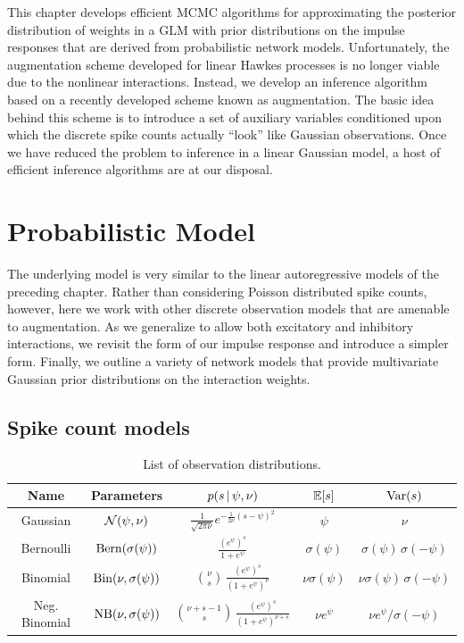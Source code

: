 This chapter develops efficient MCMC algorithms for approximating the 
posterior distribution of weights in a GLM with prior distributions on the 
impulse responses that are derived from probabilistic network models.
Unfortunately, the augmentation scheme developed for linear Hawkes 
processes is no longer viable due to the nonlinear interactions. Instead,
we develop an inference algorithm based on a recently developed scheme 
known as \polyagamma augmentation. The basic idea behind this scheme is 
to introduce a set of auxiliary variables conditioned upon which the 
discrete spike counts actually ``look'' like Gaussian observations.
Once we have reduced the problem to inference in a linear Gaussian model,
a host of efficient inference algorithms are at our disposal. 


\section{Probabilistic Model}
The underlying model is very similar to the linear autoregressive 
models of the preceding chapter. Rather than considering Poisson 
distributed spike counts, however, here we work with other discrete 
observation models that are amenable to \polyagamma augmentation. 
As we generalize to allow both excitatory and inhibitory interactions, 
we revisit the form of our impulse response and introduce a simpler
form. Finally, we outline a variety of network models that provide 
multivariate Gaussian prior distributions on the interaction weights.

\subsection{Spike count models}

\begin{table}
\begin{center}
\begin{tabular}{c|c|c|c|c}
  \textbf{Name} & Parameters & $p(s \,|\, \psi, \nu)$ & $\mathbb{E}[s]$ & $\mathrm{Var}(s)$ \\
  \hline
  Gaussian 
  & $\mathcal{N}(\psi, \nu)$ 
  & $\frac{1}{\sqrt{2 \pi \nu}} e^{ -\frac{1}{2 \nu} (s - \psi)^2}$
  & $\psi$ & $\nu$ \\
  Bernoulli 
  & $\mathrm{Bern}(\sigma(\psi))$ 
  & $\frac{(e^\psi)^s}{1+e^\psi}$
  & $\sigma(\psi)$ & $\sigma(\psi) \, \sigma(-\psi)$ \\
  Binomial 
  & $\mathrm{Bin}(\nu, \sigma(\psi))$ 
  & ${\nu \choose s} \,\frac{(e^\psi)^s}{(1+e^\psi)^\nu}$
  & $\nu \sigma(\psi)$ & $\nu \sigma(\psi) \, \sigma(-\psi)$ \\
  Neg. Binomial 
  & $\mathrm{NB}(\nu, \sigma(\psi))$
  & ${\nu +s - 1 \choose s} \,\frac{(e^\psi)^s}{(1+e^\psi)^{\nu+s}}$
  & $\nu e^\psi$ & $\nu e^\psi / \sigma(-\psi)$ \\
\end{tabular}
\end{center}
\caption{List of observation distributions.}
\label{tab:obs_models}
\end{table}

